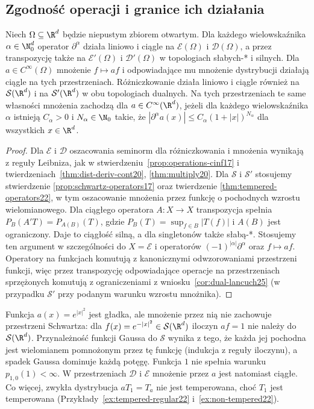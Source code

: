 \subsection{Zgodność operacji i granice ich działania}

\begin{stwierdzenie}
\label{prop:ops25}
Niech $\Omega\subseteq\R^d$ będzie niepustym zbiorem otwartym.
Dla każdego wielowskaźnika $\alpha\in\N_0^d$
operator $\partial^\alpha$ działa liniowo i ciągle na
$\mathcal E(\Omega)$ i $\mathcal D(\Omega)$, a przez
transpozycję także na $\mathcal E'(\Omega)$ i
$\mathcal D'(\Omega)$ w topologiach słabych-* i silnych.
Dla $a\in C^\infty(\Omega)$ mnożenie $f\mapsto af$
i odpowiadające mu mnożenie dystrybucji działają ciągle
na tych przestrzeniach.
Różniczkowanie działa liniowo i ciągle również na
$\mathcal S(\R^d)$ i na $\mathcal S'(\R^d)$ w obu
topologiach dualnych. Na tych przestrzeniach
te same własności mnożenia zachodzą dla
$a\in C^\infty(\R^d)$, jeżeli dla każdego
wielowskaźnika $\alpha$ istnieją $C_\alpha>0$ i
$N_\alpha\in\N_0$ takie, że
$|\partial^\alpha a(x)|\le C_\alpha(1+|x|)^{N_\alpha}$
dla wszystkich $x\in\R^d$.
\end{stwierdzenie}
\begin{proof}
Dla $\mathcal E$ i $\mathcal D$ oszacowania seminorm
dla różniczkowania i mnożenia wynikają z reguły Leibniza,
jak w stwierdzeniu~\ref{prop:operations-cinf17}
i twierdzeniach~\ref{thm:dist-deriv-cont20}, \ref{thm:multiply20}.
Dla $\mathcal S$ i $\mathcal S'$ stosujemy stwierdzenie
\ref{prop:schwartz-operators17} oraz twierdzenie
\ref{thm:tempered-operators22}, w tym oszacowanie
mnożenia przez funkcję o pochodnych wzrostu wielomianowego.
Dla ciągłego operatora $A:X\to X$ transpozycja spełnia
$P_B(A'T)=P_{A(B)}(T)$, gdzie
$P_B(T)=\sup_{f\in B}|T(f)|$ i $A(B)$ jest ograniczony.
Daje to ciągłość silną, a dla singletonów także słabą-*.
Stosujemy ten argument w szczególności do
$X=\mathcal E$ i operatorów $(-1)^{|\alpha|}\partial^\alpha$
oraz $f\mapsto af$. Operatory na funkcjach komutują
z kanonicznymi odwzorowaniami przestrzeni funkcji,
więc przez transpozycję odpowiadające operacje
na przestrzeniach sprzężonych komutują z ograniczeniami
z wniosku~\ref{cor:dual-lancuch25} (w przypadku $\mathcal S'$
przy podanym warunku wzrostu mnożnika).
\end{proof}

\begin{przyklad}
\label{ex:not-multiplier25}
Funkcja $a(x)=e^{|x|^2}$ jest gładka, ale mnożenie przez nią
nie zachowuje przestrzeni Schwartza: dla
$f(x)=e^{-|x|^2}\in\mathcal S(\R^d)$ iloczyn $af=1$
nie należy do $\mathcal S(\R^d)$. Przynależność funkcji Gaussa do $\mathcal S$ wynika
z tego, że każda jej pochodna jest wielomianem
pomnożonym przez tę funkcję (indukcja z reguły
iloczynu), a spadek Gaussa dominuje każdą potęgę.
Funkcja $1$ nie spełnia warunku $p_{1,0}(1)<\infty$.
W przestrzeniach $\mathcal D$ i $\mathcal E$
mnożenie przez $a$ jest natomiast ciągłe.
Co więcej, zwykła dystrybucja $aT_1=T_a$ nie jest
temperowana, choć $T_1$ jest temperowana
(Przykłady~\ref{ex:tempered-regular22}
i~\ref{ex:non-tempered22}).
\end{przyklad}

